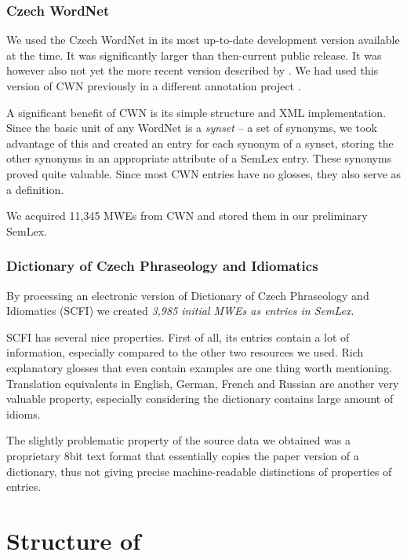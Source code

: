 \subsubsection{Czech WordNet}
\label{sec:semlex:cwn}
We used the Czech WordNet \citep{smrz:03,pala:2004} in its most up-to-date development version available at the time. It was significantly larger than then-current public release. It was however also not yet the more recent version described by \citet{pala:2007}. We had used this version of CWN previously in a different annotation project \citep{bejcek:2006}. 

A significant benefit of CWN is its simple structure and XML implementation. Since the basic unit of any WordNet is a \emph{synset} -- a set of synonyms, we took advantage of this and created an entry for each synonym of a synset, storing the other synonyms in an appropriate attribute of a SemLex entry. These synonyms proved quite valuable. Since most CWN entries have no glosses, they also serve as a definition.

We acquired 11,345 MWEs from CWN and stored them in our preliminary SemLex.
 
\subsubsection{Dictionary of Czech Phraseology and Idiomatics}
\label{sec:semlex:scfi}
By processing an electronic version of Dictionary of Czech Phraseology and Idiomatics (SCFI) \citep{cermak:1988} we created \emph{3,985 initial MWEs as entries in SemLex}. 

SCFI has several nice properties. First of all, its entries contain a lot of information, especially compared to the other two resources we used. Rich explanatory glosses that even contain examples are one thing worth mentioning. Translation equivalents in English, German, French and Russian are another very valuable property, especially considering the dictionary contains large amount of idioms.

The slightly problematic property of the source data we obtained was a proprietary 8bit text format that essentially copies the paper version of a dictionary, thus not giving precise machine-readable distinctions of properties of entries.


\section{Structure of \semlex}

